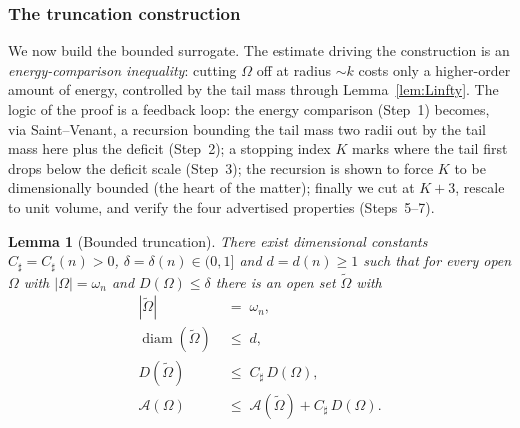 \documentclass[11pt]{amsart}
\newtheorem{lemma}[theorem]{Lemma}
\theoremstyle{definition}
\newcommand{\Om}{\Omega}
\newcommand{\Fr}{\mathcal A}
\newcommand{\abs}[1]{\left|#1\right|}
\newcommand{\Otilde}{\widetilde{\Omega}}
\DeclareMathOperator{\diam}{diam}
\begin{document}
\subsubsection{The truncation construction}\label{ssec:truncation}

We now build the bounded surrogate. The estimate driving the construction
is an \emph{energy-comparison inequality}: cutting $\Om$ off at radius
$\sim k$ costs only a higher-order amount of energy, controlled by the
tail mass through Lemma~\ref{lem:Linfty}. The logic of the proof is a
feedback loop: the energy comparison (Step~1) becomes, via Saint--Venant,
a recursion bounding the tail mass two radii out by the tail mass here
plus the deficit (Step~2); a stopping index $K$ marks where the tail
first drops below the deficit scale (Step~3); the recursion is shown to
force $K$ to be dimensionally bounded (the heart of the matter); finally
we cut at $K+3$, rescale to unit volume, and verify the four advertised
properties (Steps~5--7).

\begin{lemma}[Bounded truncation]\label{lem:truncation}
There exist dimensional constants $C_\sharp=C_\sharp(n)>0$,
$\delta=\delta(n)\in(0,1]$ and $d=d(n)\ge1$ such that for every open
$\Om$ with $\abs{\Om}=\omega_n$ and $D(\Om)\le\delta$ there is an open set
$\Otilde$ with
\begin{align}
   \abs{\Otilde}\;&=\;\omega_n,\label{eq:trunc-vol}\\
   \diam(\Otilde)\;&\le\;d,\label{eq:trunc-diam}\\
   D(\Otilde)\;&\le\;C_\sharp\,D(\Om),\label{eq:trunc-D}\\
   \Fr(\Om)\;&\le\;\Fr(\Otilde)+C_\sharp\,D(\Om).\label{eq:trunc-A}
\end{align}
\end{lemma}
\end{document}
